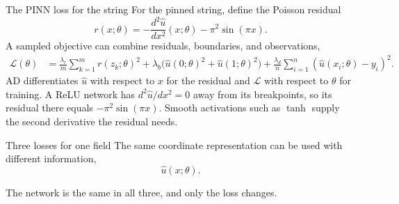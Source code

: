 \documentclass[aspectratio=169]{beamer}
\begin{document}
\begin{frame}{The PINN loss for the string}
For the pinned string, define the Poisson residual
\[
r(x;\theta)=-\frac{d^2\hat u}{dx^2}(x;\theta)-\pi^2\sin(\pi x).
\]
A sampled objective can combine residuals, boundaries, and observations,
\begin{align*}
\mathcal L(\theta)
&=\frac{\lambda_r}{m}\sum_{k=1}^{m}r(z_k;\theta)^2
+\lambda_b\bigl(\hat u(0;\theta)^2+\hat u(1;\theta)^2\bigr)
+\frac{\lambda_d}{n}\sum_{i=1}^{n}(\hat u(x_i;\theta)-y_i)^2.
\end{align*}
AD differentiates $\hat u$ with respect to $x$ for the residual and $\mathcal L$ with respect to $\theta$ for training.
A ReLU network has $d^2\hat u/dx^2=0$ away from its breakpoints, so its residual there equals $-\pi^2\sin(\pi x)$.
Smooth activations such as $\tanh$ supply the second derivative the residual needs.
\end{frame}

\begin{frame}{Three losses for one field}
The same coordinate representation can be used with different information,
\[
\hat u(x;\theta).
\]
\begin{center}
\end{center}
The network is the same in all three, and only the loss changes.
\end{frame}
\end{document}

